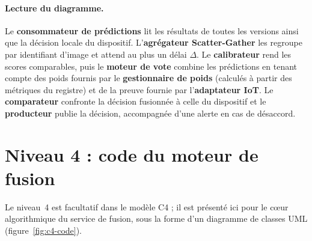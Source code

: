 \documentclass[11pt,a4paper]{report}
\begin{document}
\paragraph{Lecture du diagramme.} Le \textbf{consommateur de prédictions} lit les résultats de toutes les versions ainsi que la décision locale du dispositif. L'\textbf{agrégateur Scatter-Gather} les regroupe par identifiant d'image et attend au plus un délai $\Delta$. Le \textbf{calibrateur} rend les scores comparables, puis le \textbf{moteur de vote} combine les prédictions en tenant compte des poids fournis par le \textbf{gestionnaire de poids} (calculés à partir des métriques du registre) et de la preuve fournie par l'\textbf{adaptateur IoT}. Le \textbf{comparateur} confronte la décision fusionnée à celle du dispositif et le \textbf{producteur} publie la décision, accompagnée d'une alerte en cas de désaccord.

\section{Niveau 4 : code du moteur de fusion}

Le niveau~4 est facultatif dans le modèle C4 ; il est présenté ici pour le cœur algorithmique du service de fusion, sous la forme d'un diagramme de classes UML (figure~\ref{fig:c4-code}).
\end{document}
